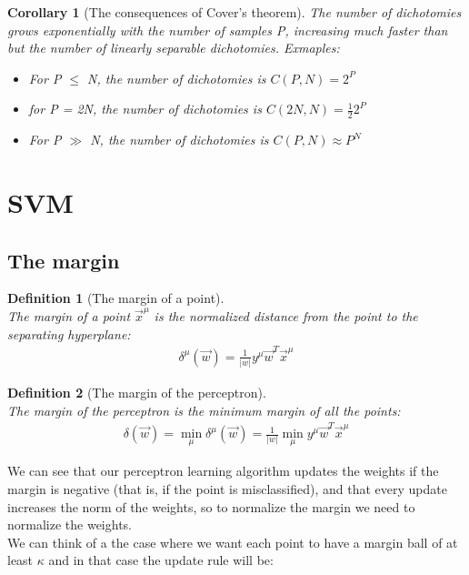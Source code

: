\documentclass[11pt]{book} %
\newtheorem{definition}{Definition}[section]
\newtheorem{corollary}{Corollary}[section]
\begin{document}
\begin{corollary}[The consequences of Cover's theorem]
    The number of dichotomies grows exponentially with the number of samples P, increasing much faster than but the number of linearly separable dichotomies.
    Exmaples: 
    \begin{itemize}    
        \item For P $\leq$ N, the number of dichotomies is $C(P,N) = 2^P$
        \item for P = 2N, the number of dichotomies is $C(2N,N) = \frac{1}{2} 2^{P}$
        \item For P $\gg$ N, the number of dichotomies is $C(P,N) \approx P^N$
    \end{itemize}
\end{corollary}
    
    

%
%
%


\section{SVM}
\subsection{The margin}

\begin{definition}[The margin of a point]\ \\
    The margin of a point $\vec{x}^\mu$ is the normalized distance from the point to the separating hyperplane:
    \begin{align}
        \delta^\mu(\vec{w}) = \frac{1}{|w|} y^\mu \vec{w}^T \vec{x}^\mu
    \end{align}
\end{definition}

\begin{definition}[The margin of the perceptron]\ \\
    The margin of the perceptron is the minimum margin of all the points:
    \begin{align}
        \delta(\vec{w}) = \min_{\mu} \delta^\mu(\vec{w}) = \frac{1}{|w|} \min_{\mu} y^\mu \vec{w}^T \vec{x}^\mu
    \end{align}
\end{definition}
We can see that our perceptron learning algorithm updates the weights if the margin is negative (that is, if the point is misclassified), 
and that every update increases the norm of the weights, so to normalize the margin we need to normalize the weights. \\
We can think of a the case where we want each point to have a margin ball of at least $\kappa$ and in that case the update rule will be:
\end{document}
